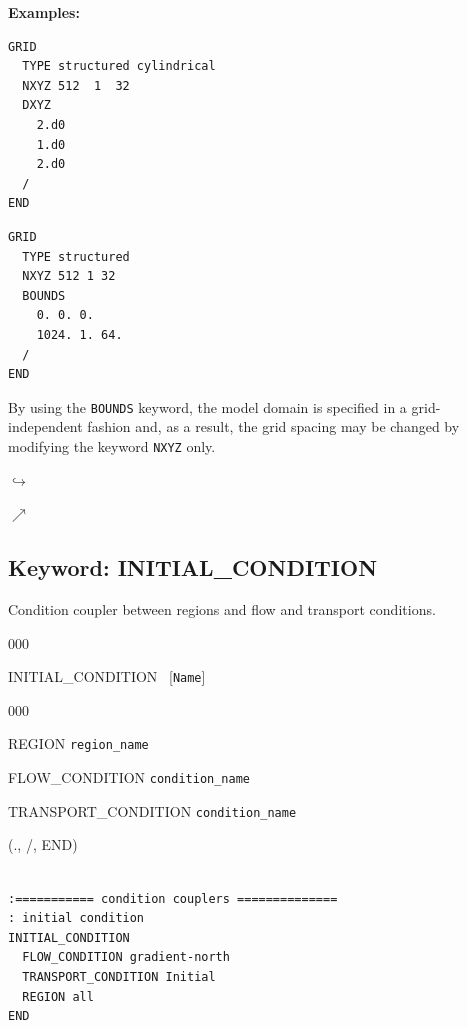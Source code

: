 \documentclass[12pt]{article}
\newcommand\return{{\hfill$\hookrightarrow$}}
\newcommand\returnb{{\hfill$\nearrow$}}
\begin{document}
\noindent
{\bf Examples:}
\begin{verbatim}
GRID
  TYPE structured cylindrical
  NXYZ 512  1  32
  DXYZ
    2.d0
    1.d0
    2.d0
  /
END
\end{verbatim}

\begin{verbatim}
GRID
  TYPE structured
  NXYZ 512 1 32
  BOUNDS
    0. 0. 0.
    1024. 1. 64.
  /
END
\end{verbatim}

\noindent
By using the {\tt BOUNDS} keyword, the model domain is specified in a grid-independent fashion and, as a result, the grid spacing may be changed by modifying the keyword {\tt NXYZ} only.

\hyperlink{target_key}{\return}

\hyperlink{target_input_file}{\returnb}


\newpage
\protect\hypertarget{target_init}{}

\subsection{Keyword: INITIAL\_CONDITION}

 Condition coupler between regions and flow and transport conditions.

\begin{deflist}{000}
\item[INITIAL\_CONDITION] \ [{\tt Name}]
\begin{deflist}{000}
\item[REGION] {\tt region\_name}
\item[FLOW\_CONDITION] {\tt condition\_name}
\item[TRANSPORT\_CONDITION] {\tt condition\_name}
\end{deflist}
\item[(., /, END)] ~
\end{deflist}



\begin{verbatim}

:=========== condition couplers ==============
: initial condition
INITIAL_CONDITION
  FLOW_CONDITION gradient-north
  TRANSPORT_CONDITION Initial
  REGION all
END
\end{verbatim}
\end{document}

